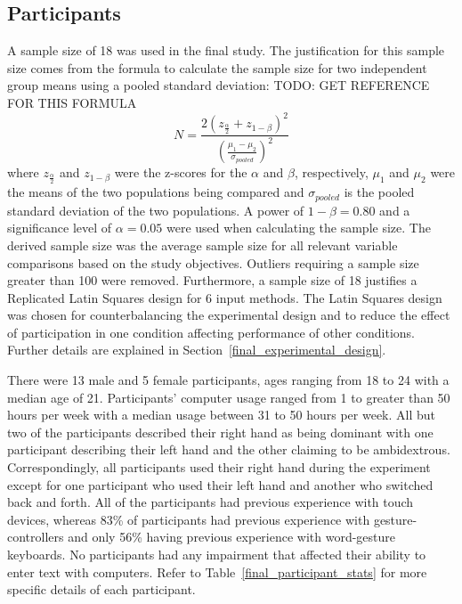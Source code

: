 \subsection{Participants} \label{final_participants}
A sample size of 18 was used in the final study. The justification for this sample size comes from the formula to calculate the sample size for two independent group means using a pooled standard deviation: TODO: GET REFERENCE FOR THIS FORMULA
\begin{equation}
N = \frac{2(z_{\frac{\alpha}{2}} + z_{1-\beta})^2}{(\frac{\mu_1 - \mu_2}{\sigma_{pooled}})^2}
\end{equation}
where $z_{\frac{\alpha}{2}}$ and $z_{1-\beta}$ were the z-scores for the $\alpha$ and $\beta$, respectively, $\mu_1$ and $\mu_2$ were the means of the two populations being compared and $\sigma_{pooled}$ is the pooled standard deviation of the two populations. A power of $1-\beta = 0.80$ and a significance level of $\alpha = 0.05$ were used when calculating the sample size. The derived sample size was the average sample size for all relevant variable comparisons based on the study objectives. Outliers requiring a sample size greater than 100 were removed. Furthermore, a sample size of 18 justifies a Replicated Latin Squares design for 6 input methods. The Latin Squares design was chosen for counterbalancing the experimental design and to reduce the effect of participation in one condition affecting performance of other conditions. Further details are explained in Section~\ref{final_experimental_design}.

There were 13 male and 5 female participants, ages ranging from 18 to 24 with a median age of 21. Participants' computer usage ranged from 1 to greater than 50 hours per week with a median usage between 31 to 50 hours per week. All but two of the participants described their right hand as being dominant with one participant describing their left hand and the other claiming to be ambidextrous. Correspondingly, all participants used their right hand during the experiment except for one participant who used their left hand and another who switched back and forth. All of the participants had previous experience with touch devices, whereas 83\% of participants had previous experience with gesture-controllers and only 56\% having previous experience with word-gesture keyboards. No participants had any impairment that affected their ability to enter text with computers. Refer to Table~\ref{final_participant_stats} for more specific details of each participant.

